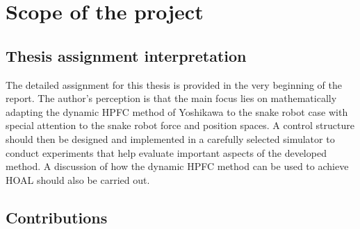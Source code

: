 \section{Scope of the project}

\subsection{Thesis assignment interpretation}

The detailed assignment for this thesis is provided in the very beginning of the report. The author's perception is that the main focus lies on mathematically adapting the dynamic HPFC method of Yoshikawa \cite{yoshikawa1987dynamic} to the snake robot case with special attention to the snake robot force and position spaces. A control structure should then be designed and implemented in a carefully selected simulator to conduct experiments that help evaluate important aspects of the developed method. A discussion of how the dynamic HPFC method can be used to achieve HOAL should also be carried out.







\subsection{Contributions}

